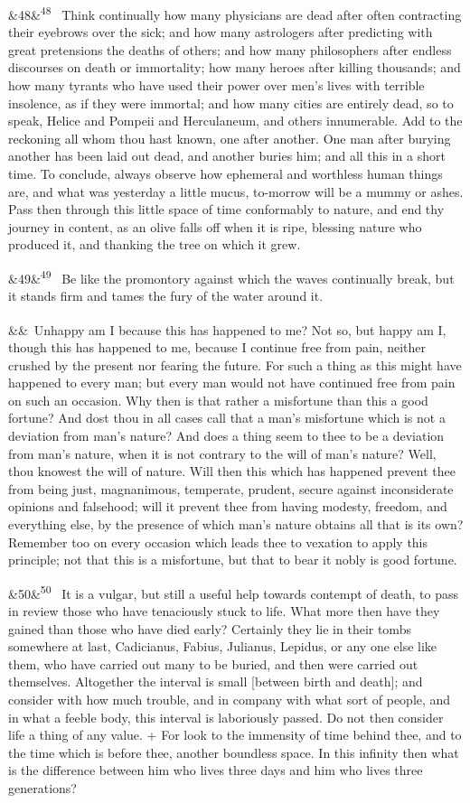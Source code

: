 \documentclass[12pt]{article}
\newcommand{\para}[1][]{\par\noindent\ifx&#1&\else\textsuperscript{\footnotesize #1}~\fi}
\begin{document}
\para[48] Think continually how many physicians are dead after often
contracting their eyebrows over the sick; and how many astrologers after
predicting with great pretensions the deaths of others; and how many
philosophers after endless discourses on death or immortality; how many
heroes after killing thousands; and how many tyrants who have used their
power over men's lives with terrible insolence, as if they were
immortal; and how many cities are entirely dead, so to speak, Helice
and Pompeii and Herculaneum, and others innumerable. Add to the
reckoning all whom thou hast known, one after another. One man after
burying another has been laid out dead, and another buries him; and all
this in a short time. To conclude, always observe how ephemeral and
worthless human things are, and what was yesterday a little mucus,
to-morrow will be a mummy or ashes. Pass then through this little space
of time conformably to nature, and end thy journey in content, as an
olive falls off when it is ripe, blessing nature who produced it, and
thanking the tree on which it grew.

\para[49] Be like the promontory against which the waves continually break,
but it stands firm and tames the fury of the water around it.

\para Unhappy am I because this has happened to me? Not so, but happy am I,
though this has happened to me, because I continue free from pain,
neither crushed by the present nor fearing the future. For such a thing
as this might have happened to every man; but every man would not have
continued free from pain on such an occasion. Why then is that rather a
misfortune than this a good fortune? And dost thou in all cases call
that a man's misfortune which is not a deviation from man's nature? And
does a thing seem to thee to be a deviation from man's nature, when it
is not contrary to the will of man's nature? Well, thou knowest the will
of nature. Will then this which has happened prevent thee from being
just, magnanimous, temperate, prudent, secure against inconsiderate
opinions and falsehood; will it prevent thee from having modesty,
freedom, and everything else, by the presence of which man's nature
obtains all that is its own? Remember too on every occasion which leads
thee to vexation to apply this principle; not that this is a misfortune,
but that to bear it nobly is good fortune.

\para[50] It is a vulgar, but still a useful help towards contempt of death,
to pass in review those who have tenaciously stuck to life. What more
then have they gained than those who have died early? Certainly they
lie in their tombs somewhere at last, Cadicianus, Fabius, Julianus,
Lepidus, or any one else like them, who have carried out many to be
buried, and then were carried out themselves. Altogether the interval is
small [between birth and death]; and consider with how much trouble, and
in company with what sort of people, and in what a feeble body, this
interval is laboriously passed. Do not then consider life a thing of any
value. + For look to the immensity of time behind thee, and to the time
which is before thee, another boundless space. In this infinity then
what is the difference between him who lives three days and him who
lives three generations?
\end{document}
